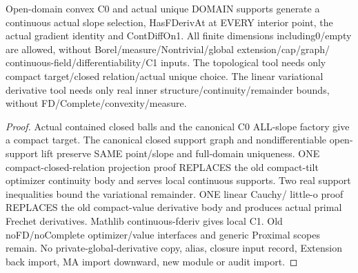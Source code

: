 \begin{lemma}
  \label{lem:local-convex-c1}
  \leanok
  Open-domain convex C0 and actual unique DOMAIN supports generate a continuous
  actual slope selection, HasFDerivAt at EVERY interior point, the actual
  gradient identity and ContDiffOn1. All finite dimensions including0/empty
  are allowed, without Borel/measure/Nontrivial/global extension/cap/graph/
  continuous-field/differentiability/C1 inputs. The topological tool needs only
  compact target/closed relation/actual unique choice. The linear variational
  derivative tool needs only real inner structure/continuity/remainder bounds,
  without FD/Complete/convexity/measure.
\end{lemma}
\begin{proof}
  \leanok
  Actual contained closed balls and the canonical C0 ALL-slope factory give a
  compact target. The canonical closed support graph and nondifferentiable
  open-support lift preserve SAME point/slope and full-domain uniqueness.
  ONE compact-closed-relation projection proof REPLACES the old compact-tilt
  optimizer continuity body and serves local continuous supports. Two real
  support inequalities bound the variational remainder. ONE linear Cauchy/
  little-o proof REPLACES the old compact-value derivative body and produces
  actual primal Frechet derivatives. Mathlib continuous-fderiv gives local C1.
  Old noFD/noComplete optimizer/value interfaces and generic Proximal scopes
  remain. No private-global-derivative copy, alias, closure input record,
  Extension back import, MA import downward, new module or audit import.
\end{proof}

